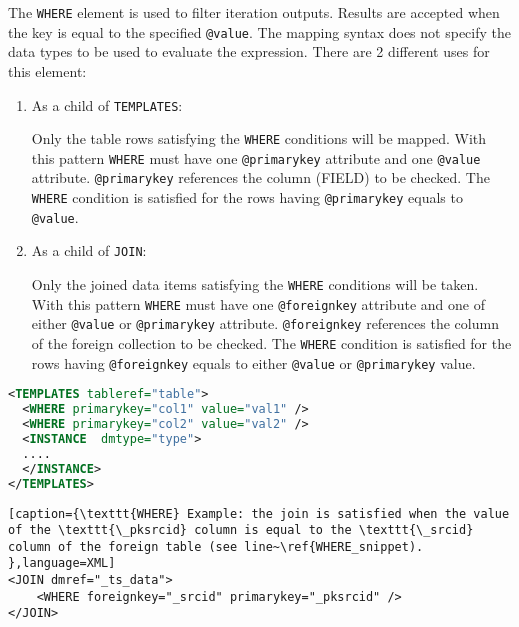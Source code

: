 The \texttt{WHERE} element is used to filter iteration outputs. Results are accepted when the key is equal to the specified \texttt{@value}. The mapping syntax does not specify the data types to be used to evaluate the expression. 
There  are 2 different uses for this element:
\begin{enumerate}
\item{As a child of \texttt{TEMPLATES}:}

  Only the table rows satisfying the \texttt{WHERE} conditions will be mapped. 
  With this pattern \texttt{WHERE} must have one \texttt{@primarykey} attribute and one \texttt{@value} attribute. 
  \texttt{@primarykey} references the column (FIELD) to be checked. 
  The \texttt{WHERE} condition is satisfied for the rows having \texttt{@primarykey} equals to \texttt{@value}.
             
\item{As a child of \texttt{JOIN}:}
      
  Only the joined data items satisfying the \texttt{WHERE} conditions will be taken. 
  With this pattern \texttt{WHERE} must have one \texttt{@foreignkey} attribute and one of either \texttt{@value} or \texttt{@primarykey} attribute. 
  \texttt{@foreignkey} references the column of the foreign collection to be checked. 
  The \texttt{WHERE} condition is satisfied for the rows having \texttt{@foreignkey} equals to either \texttt{@value} or \texttt{@primarykey} value.

\end{enumerate}

\begin{lstlisting}[caption={\texttt{WHERE} Example: only rows having \texttt{val1} as \texttt{col1} value and  \texttt{val2} as \texttt{col2} value must be mapped.},language=XML]
<TEMPLATES tableref="table">
  <WHERE primarykey="col1" value="val1" />
  <WHERE primarykey="col2" value="val2" />
  <INSTANCE  dmtype="type">
  ....
  </INSTANCE>
</TEMPLATES>
\end{lstlisting}

\begin{lstlisting}[caption={\texttt{WHERE} Example: the join is satisfied when the value of the \texttt{\_pksrcid} column is equal to the \texttt{\_srcid} column of the foreign table (see line~\ref{WHERE_snippet). },language=XML]
<JOIN dmref="_ts_data">
    <WHERE foreignkey="_srcid" primarykey="_pksrcid" />
</JOIN>
\end{lstlisting}

